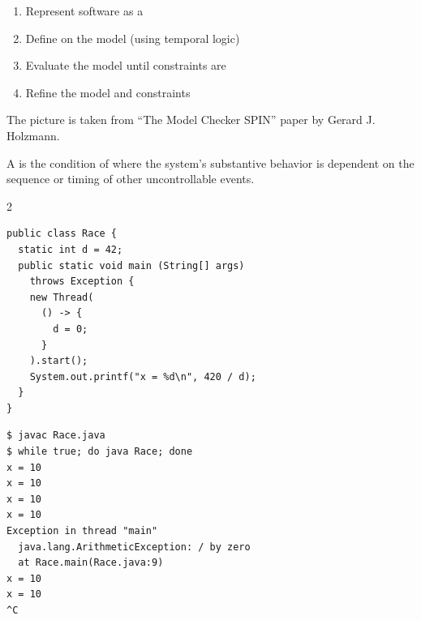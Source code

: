 \documentclass{article}
\begin{document}
\begin{enumerate}
\item Represent software as a 
\item Define  on the model (using temporal logic)
\item Evaluate the model until constraints are 
\item Refine the model and constraints
\end{enumerate}

\plush{}



{\scriptsize The picture is taken from ``The Model Checker SPIN'' paper by Gerard J. Holzmann.}

\plush{}



\plush{}



A  is the condition of where the system's substantive behavior is dependent on the sequence
or timing of other uncontrollable events.

\begin{pptWide}{2}
{\scriptsize\begin{verbatim}
public class Race {
  static int d = 42;
  public static void main (String[] args)
    throws Exception {
    new Thread(
      () -> {
        d = 0;
      }
    ).start();
    System.out.printf("x = %d\n", 420 / d);
  }
}
\end{verbatim}
}
\par\columnbreak\par
{\scriptsize\begin{verbatim}
$ javac Race.java
$ while true; do java Race; done
x = 10
x = 10
x = 10
x = 10
Exception in thread "main"
  java.lang.ArithmeticException: / by zero
  at Race.main(Race.java:9)
x = 10
x = 10
^C
\end{verbatim}
}
\end{pptWide}
\plush{}

\end{document}

